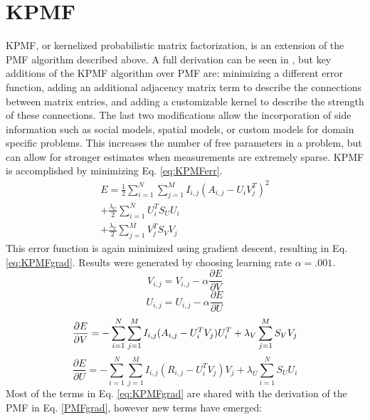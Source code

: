 \documentclass[journal]{IEEEtran}
\begin{document}
\section{KPMF}
KPMF, or kernelized probabilistic matrix factorization, is an extension of the PMF algorithm described above. A full derivation can be seen in 
\cite{KPMFpaper}, but key additions of the KPMF algorithm over PMF are: minimizing a different error function, adding an additional adjacency 
matrix term to describe the connections between matrix entries, and adding a customizable kernel to describe the strength of these connections. The last
two modifications allow the incorporation of side information such as social models, spatial models, or custom models for domain specific
problems. This increases the number of free parameters in a problem, but can allow for stronger estimates when measurements are 
extremely sparse. KPMF is accomplished by minimizing Eq. \ref{eq:KPMFerr}.
\begin{align}
    E=\frac{1}{2}\sum\limits_{i=1}^N\sum\limits_{j=1}^MI_{i,j}(A_{i,j}-U_iV_j^T)^2 \nonumber \\
    +\frac{\lambda_U}{2}\sum\limits_{i=1}^NU^T_iS_UU_i \nonumber \\
    + \frac{\lambda_V}{2}\sum\limits_{j=1}^MV^T_jS_VV_j
\label{eq:KPMFerr}
\end{align}
This error function is again minimized using gradient descent, resulting in Eq. \ref{eq:KPMFgrad}. Results were generated by choosing learning rate 
\begin{math}\alpha = .001\end{math}.
\begin{equation}
    V_{i,j} = V_{i,j} - \alpha\frac{\partial E}{\partial V} \nonumber
\end{equation}
\begin{equation}
    U_{i,j} = U_{i,j} - \alpha\frac{\partial E}{\partial U} \nonumber
\end{equation}
\begin{equation}
    \frac{\partial E}{\partial V} = -\sum\limits_{i=1}^N\sum\limits_{j=1}^MI_{i,j}(A_{i,j}-U_i^TV_j)U_i^T + \lambda_V\sum\limits_{j=1}^MS_VV_j \nonumber \\
\end{equation}
\begin{equation}
    \frac{\partial E}{\partial U} = -\sum\limits_{i=1}^N\sum\limits_{j=1}^MI_{i,j}(R_{i,j}-U_i^TV_j)V_j + \lambda_U\sum\limits_{i=1}^NS_UU_i
    \label{eq:KPMFgrad}
\end{equation}
Most of the terms in Eq. \ref{eq:KPMFgrad} are shared with the derivation of the PMF in Eq. \ref{PMFgrad}, however new terms have emerged: 
\end{document}
